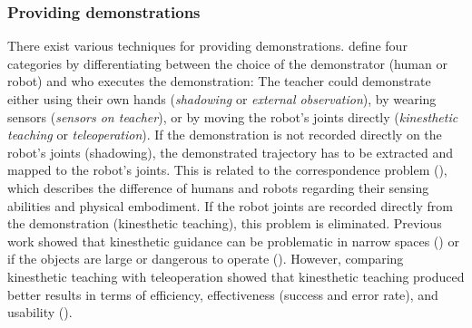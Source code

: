 

\subsubsection{Providing demonstrations}
There exist various techniques for providing demonstrations.
\cite{argall2009survey} define four categories by differentiating between the choice of the demonstrator (human or robot) and who executes the demonstration:
The teacher could demonstrate either using their own hands (\textit{shadowing} %
 or \textit{external observation}), by wearing sensors (\textit{sensors on teacher}), or by moving the robot's joints directly (\textit{kinesthetic teaching} or \textit{teleoperation}).
If the demonstration is not recorded directly on the robot's joints (\eg shadowing), the demonstrated trajectory has to be extracted and mapped to the robot's joints.
This is related to the correspondence problem (\cite{nehaniv2002correspondence}), which describes the difference of humans and robots regarding their sensing abilities and physical embodiment.
If the robot joints are recorded directly from the demonstration (\eg kinesthetic teaching), this problem is eliminated.
Previous work showed that kinesthetic guidance can be problematic in narrow spaces (\cite{wrede2013user}) or if the objects are large or dangerous to operate (\cite{chernova2014robot}).
However, comparing kinesthetic teaching with teleoperation showed that kinesthetic teaching produced better results in terms of efficiency, effectiveness (success and error rate), and usability (\cite{fischer2016comparison,chernova2014robot,akgun2011robot}).


